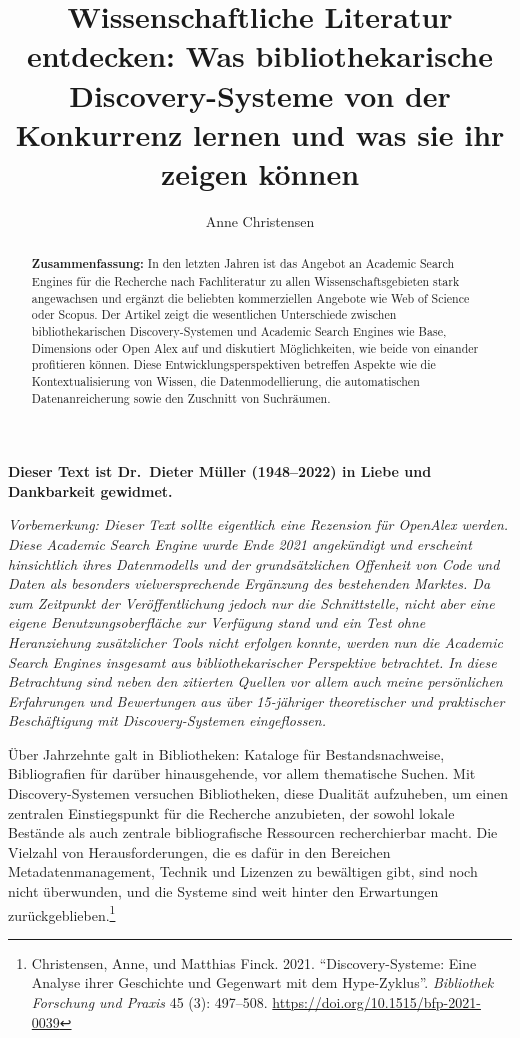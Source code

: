 \documentclass[a4paper,
fontsize=11pt,
oneside,
numbers=noperiodatend,
parskip=half-,
bibliography=totoc,
final
]{scrartcl}
\title{\LARGE{Wissenschaftliche Literatur entdecken: Was bibliothekarische Discovery-Systeme von der Konkurrenz lernen und was sie ihr zeigen können}}%
\author{Anne Christensen} %
\date{}
\begin{document}
\maketitle
\thispagestyle{fancyplain} 

\begin{abstract}
\noindent
\textbf{Zusammenfassung:} In den letzten Jahren ist das Angebot an
Academic Search Engines für die Recherche nach Fachliteratur zu allen
Wissenschaftsgebieten stark angewachsen und ergänzt die beliebten
kommerziellen Angebote wie Web of Science oder Scopus. Der Artikel zeigt
die wesentlichen Unterschiede zwischen bibliothekarischen
Discovery-Systemen und Academic Search Engines wie Base, Dimensions oder
Open Alex auf und diskutiert Möglichkeiten, wie beide von einander
profitieren können. Diese Entwicklungsperspektiven betreffen Aspekte wie
die Kontextualisierung von Wissen, die Datenmodellierung, die
automatischen Datenanreicherung sowie den Zuschnitt von Suchräumen.
\end{abstract}

\begin{center}
\textbf{Dieser Text ist Dr.~Dieter Müller (1948--2022) in Liebe und
Dankbarkeit gewidmet.}
\end{center}

\emph{Vorbemerkung: Dieser Text sollte eigentlich eine Rezension für
OpenAlex werden. Diese Academic Search Engine wurde Ende 2021
angekündigt und erscheint hinsichtlich ihres Datenmodells und der
grundsätzlichen Offenheit von Code und Daten als besonders
vielversprechende Ergänzung des bestehenden Marktes. Da zum Zeitpunkt
der Veröffentlichung jedoch nur die Schnittstelle, nicht aber eine
eigene Benutzungsoberfläche zur Verfügung stand und ein Test ohne
Heranziehung zusätzlicher Tools nicht erfolgen konnte, werden nun die
Academic Search Engines insgesamt aus bibliothekarischer Perspektive
betrachtet. In diese Betrachtung sind neben den zitierten Quellen vor
allem auch meine persönlichen Erfahrungen und Bewertungen aus über
15-jähriger theoretischer und praktischer Beschäftigung mit
Discovery-Systemen eingeflossen.}

Über Jahrzehnte galt in Bibliotheken: Kataloge für Bestandsnachweise,
Bibliografien für darüber hinausgehende, vor allem thematische Suchen.
Mit Discovery-Systemen versuchen Bibliotheken, diese Dualität
aufzuheben, um einen zentralen Einstiegspunkt für die Recherche
anzubieten, der sowohl lokale Bestände als auch zentrale bibliografische
Ressourcen recherchierbar macht. Die Vielzahl von Herausforderungen, die
es dafür in den Bereichen Metadatenmanagement, Technik und Lizenzen zu
bewältigen gibt, sind noch nicht überwunden, und die Systeme sind weit
hinter den Erwartungen zurückgeblieben.\footnote{Christensen, Anne, und
  Matthias Finck. 2021. \enquote{Discovery-Systeme: Eine Analyse ihrer
  Geschichte und Gegenwart mit dem Hype-Zyklus}. \emph{Bibliothek
  Forschung und Praxis} 45 (3): 497--508.
  \url{https://doi.org/10.1515/bfp-2021-0039}}
\end{document}
